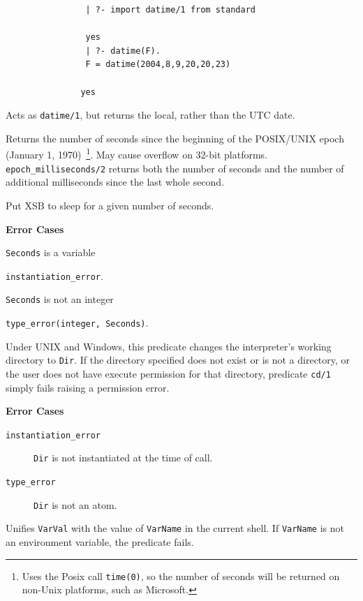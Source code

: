 \begin{description}
{\begin{verbatim}
                | ?- import datime/1 from standard

                yes
                | ?- datime(F).
                F = datime(2004,8,9,20,20,23)

               yes
\end{verbatim}}

%
Acts as {\tt datime/1}, but returns the local, rather than the UTC date.

%
Returns the number of seconds since the beginning of the POSIX/UNIX
epoch (January 1, 1970)~\footnote{Uses the Posix call {\tt time(0)},
  so the number of seconds will be returned on non-Unix platforms,
  such as Microsoft.}.  May cause overflow on 32-bit platforms.
\texttt{epoch\_milliseconds/2} returns both the number of seconds and
the number of additional milliseconds since the last whole second.

\noindent
Put XSB to sleep for a given number of seconds.  

{\bf Error Cases}
\bi
\item 	{\tt Seconds} is a variable
\bi
\item 	{\tt instantiation\_error}.
\ei
\item 	{\tt Seconds} is not an integer
\bi
\item 	{\tt type\_error(integer, Seconds)}.
\ei
\ei

    Under UNIX and Windows, this predicate changes the interpreter's
    working directory to {\tt Dir}.  If the directory specified does
    not exist or is not a directory, or the user does not have execute
    permission for that directory, predicate {\tt cd/1} simply fails
    raising a permission error.

{\bf Error Cases}
    \begin{description}
    \item[{\tt instantiation\_error}]
        {\tt Dir} is not instantiated at the time of call.
    \item[{\tt type\_error}]
        {\tt Dir} is not an atom.
    \end{description}

\noindent
Unifies {\tt VarVal} with the value of {\tt VarName} in the current
shell.  If {\tt VarName} is not an environment variable, the predicate
fails.


\end{description}

